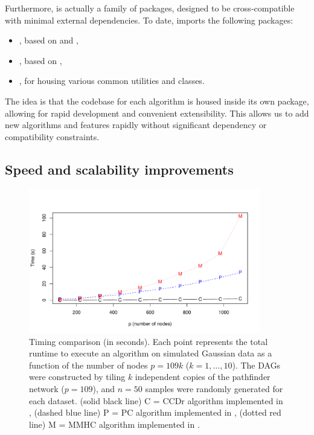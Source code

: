\documentclass[article]{jss}
\renewcommand{\|}{\,|\,}
\begin{document}
Furthermore,  is actually a family of  packages, designed to be cross-compatible with minimal external dependencies. To date,  imports the following packages:
\begin{itemize}
\item {}, based on \citet{aragam2015} and \citet{fu2013},
\item {}, based on \citet{gu2018},
\item {}, for housing various common utilities and classes.
\end{itemize}

\noindent
The idea is that the codebase for each algorithm is housed inside its own package, allowing for rapid development and convenient extensibility. This allows us to add new algorithms and features rapidly without significant dependency or compatibility constraints. 

\subsection{Speed and scalability improvements}

\begin{figure}[t!]
\centering
\includegraphics[width=0.9\textwidth]{scalability.pdf}
\caption{Timing comparison (in seconds). Each point represents the total runtime to execute an algorithm on simulated Gaussian data as a function of the number of nodes $p=109k$ ($k=1,\ldots,10$). The DAGs were constructed by tiling $k$ independent copies of the pathfinder network ($p=109$), and $n=50$ samples were randomly generated for each dataset.
(solid black line) C = CCDr algorithm implemented in , (dashed blue line) P = PC algorithm implemented in , (dotted red line) M = MMHC algorithm implemented in .}
\label{fig:scalability}
\end{figure}
\end{document}
